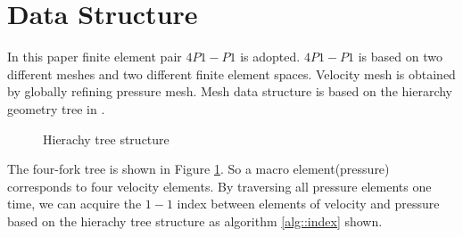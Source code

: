\documentclass[a4paper, 11pt]{article}
\begin{document}
\section{Data Structure}
   In this paper finite element pair $4P1-P1$ is adopted. $4P1-P1$ is
   based on two different meshes and two different finite element
   spaces. Velocity mesh is obtained by globally refining pressure
   mesh. Mesh data structure is based on the hierarchy geometry tree
   in \cite{li2005multi}.
   \begin{figure}[h]
     \caption{Hierachy tree structure}
     \label{fig::hgrometrytree}
   \end{figure}
   The four-fork tree is shown in Figure \ref{fig::hgrometrytree}.
   So a macro element(pressure) corresponds to four velocity elements. 
   By traversing all pressure elements one time, we can acquire the $1-1$
   index between elements of velocity and pressure based on the
   hierachy tree structure as algorithm \ref{alg::index} shown.  
\end{document}

